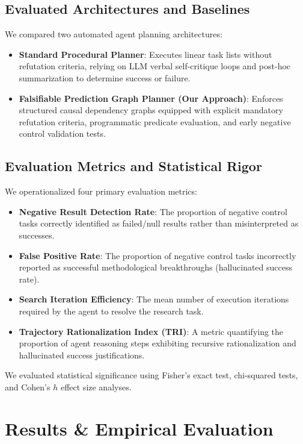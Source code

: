 \documentclass[11pt,letterpaper]{article}
\begin{document}
\subsection{Evaluated Architectures and Baselines}
We compared two automated agent planning architectures:
\begin{itemize}
    \item \textbf{Standard Procedural Planner}: Executes linear task lists without refutation criteria, relying on LLM verbal self-critique loops and post-hoc summarization to determine success or failure.
    \item \textbf{Falsifiable Prediction Graph Planner (Our Approach)}: Enforces structured causal dependency graphs equipped with explicit mandatory refutation criteria, programmatic predicate evaluation, and early negative control validation tests.
\end{itemize}

\subsection{Evaluation Metrics and Statistical Rigor}
We operationalized four primary evaluation metrics:
\begin{itemize}
    \item \textbf{Negative Result Detection Rate}: The proportion of negative control tasks correctly identified as failed/null results rather than misinterpreted as successes.
    \item \textbf{False Positive Rate}: The proportion of negative control tasks incorrectly reported as successful methodological breakthroughs (hallucinated success rate).
    \item \textbf{Search Iteration Efficiency}: The mean number of execution iterations required by the agent to resolve the research task.
    \item \textbf{Trajectory Rationalization Index (TRI)}: A metric quantifying the proportion of agent reasoning steps exhibiting recursive rationalization and hallucinated success justifications.
\end{itemize}

We evaluated statistical significance using Fisher's exact test, chi-squared tests, and Cohen's $h$ effect size analyses.

\section{Results \& Empirical Evaluation}
\end{document}
